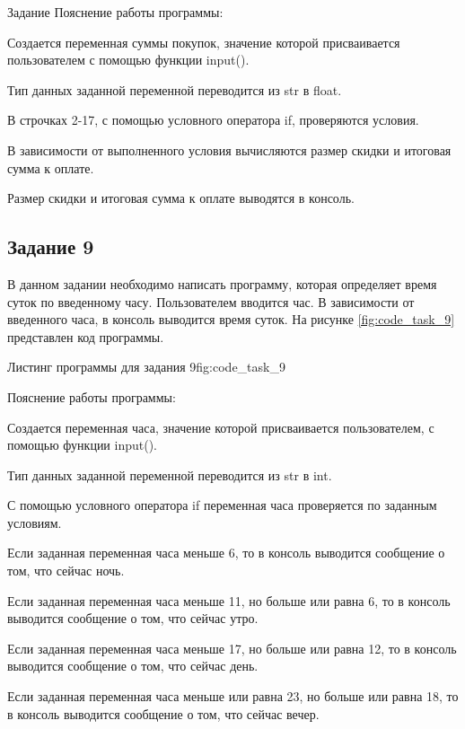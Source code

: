 \documentclass[]{vvsu}
\begin{document}
\begin{addition}{Задание}
Пояснение работы программы:
\begin{vvsu_list}
  \item Создается переменная суммы покупок, значение которой присваивается пользователем с помощью функции input().
  \item Тип данных заданной переменной переводится из str в float.
  \item В строчках 2-17, с помощью условного оператора if, проверяются условия.
  \item В зависимости от выполненного условия вычисляются размер скидки и итоговая сумма к оплате.
  \item Размер скидки и итоговая сумма к оплате выводятся в консоль.
\end{vvsu_list}

\subsection{Задание 9}

В данном задании необходимо написать программу, которая определяет время суток по введенному часу.  
Пользователем вводится час. В зависимости от введенного часа, в консоль выводится время суток. 
На рисунке \ref{fig:code_task_9} представлен код программы.

\begin{vvsu_figure}{Листинг программы для задания 9}{fig:code_task_9}
  \begin{minipage}{.75\textwidth}
    
  \end{minipage}
\end{vvsu_figure}

Пояснение работы программы:
\begin{vvsu_list}
  \item Создается переменная часа, значение которой присваивается пользователем, с помощью функции input().
  \item Тип данных заданной переменной переводится из str в int.
  \item С помощью условного оператора if переменная часа проверяется по заданным условиям.
  \item Если заданная переменная часа меньше 6, то в консоль выводится сообщение о том, что сейчас ночь.
  \item Если заданная переменная часа меньше 11, но больше или равна 6, то в консоль выводится сообщение о том, что сейчас утро.
  \item Если заданная переменная часа меньше 17, но больше или равна 12, то в консоль выводится сообщение о том, что сейчас день.
  \item Если заданная переменная часа меньше или равна 23, но больше или равна 18, то в консоль выводится сообщение о том, что сейчас вечер.
\end{vvsu_list}


\end{addition}
\end{document}
